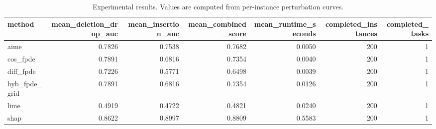 \begin{table}[t]
\caption{Experimental results. Values are computed from per-instance perturbation curves.}
\label{tab:main_results_computed}
\centering
\begin{tabular}{lrrrrrr}
\toprule
method & mean\_deletion\_drop\_auc & mean\_insertion\_auc & mean\_combined\_score & mean\_runtime\_seconds & completed\_instances & completed\_tasks \\
\midrule
aime & 0.7826 & 0.7538 & 0.7682 & 0.0050 & 200 & 1 \\
cos\_fpde & 0.7891 & 0.6816 & 0.7354 & 0.0040 & 200 & 1 \\
diff\_fpde & 0.7226 & 0.5771 & 0.6498 & 0.0039 & 200 & 1 \\
hyb\_fpde\_grid & 0.7891 & 0.6816 & 0.7354 & 0.0126 & 200 & 1 \\
lime & 0.4919 & 0.4722 & 0.4821 & 0.0240 & 200 & 1 \\
shap & 0.8622 & 0.8997 & 0.8809 & 0.5583 & 200 & 1 \\
\bottomrule
\end{tabular}

\end{table}
